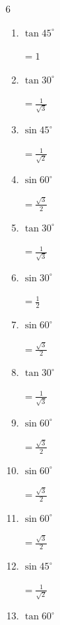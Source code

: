 \begin{multicols}{6}
\begin{enumerate}
        $\displaystyle =\frac{\sqrt{3}}{2}$

  \item $\displaystyle \tan{45^\circ}$

        $\displaystyle =1$

  \item $\displaystyle \tan{30^\circ}$

        $\displaystyle =\frac{1}{\sqrt{3}}$

\columnbreak %

  \item $\displaystyle \sin{45^\circ}$

        $\displaystyle =\frac{1}{\sqrt{2}}$

  \item $\displaystyle \sin{60^\circ}$

        $\displaystyle =\frac{\sqrt{3}}{2}$

  \item $\displaystyle \tan{30^\circ}$

        $\displaystyle =\frac{1}{\sqrt{3}}$

  \item $\displaystyle \sin{30^\circ}$

        $\displaystyle =\frac{1}{2}$

  \item $\displaystyle \sin{60^\circ}$

        $\displaystyle =\frac{\sqrt{3}}{2}$

  \item $\displaystyle \tan{30^\circ}$

        $\displaystyle =\frac{1}{\sqrt{3}}$

  \item $\displaystyle \sin{60^\circ}$

        $\displaystyle =\frac{\sqrt{3}}{2}$

  \item $\displaystyle \sin{60^\circ}$

        $\displaystyle =\frac{\sqrt{3}}{2}$

  \item $\displaystyle \sin{60^\circ}$

        $\displaystyle =\frac{\sqrt{3}}{2}$

  \item $\displaystyle \sin{45^\circ}$

        $\displaystyle =\frac{1}{\sqrt{2}}$

  \item $\displaystyle \tan{60^\circ}$


\end{enumerate}
\end{multicols}
